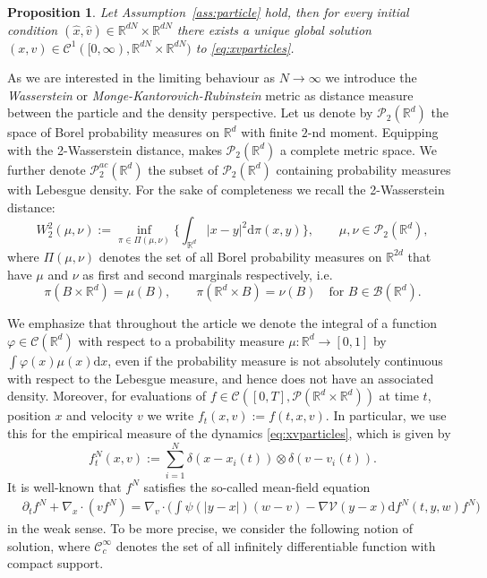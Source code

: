 \documentclass[11pt]{article}
\newtheorem{proposition}[theorem]{Proposition}
\newcommand{\R}[0]{\mathbb R}
\newcommand{\calC}[0]{\mathcal C}
\newcommand{\calP}[0]{\mathcal P}
\newcommand{\dd}[0]{\mathrm d}
\newcommand{\sumi}[0]{\sum_{i=1}^N}
\newcommand{\V}[0]{\mathcal V}
\newcommand{\fN}[0]{f^N}
\begin{document}
\begin{bibunit}[abbrv]
\begin{proposition}\label{prop:WellODE}\cite{teschl}
Let Assumption~\ref{ass:particle} hold, then for every initial condition $(\hat x, \hat v) \in \R^{dN}\times \R^{dN}$ there exists a unique global solution $(x,v) \in \calC^1([0,\infty),\R^{dN}\times\R^{dN})$ to  \eqref{eq:xvparticles}.
\end{proposition}
%
As we are interested in the limiting behaviour as $N\rightarrow \infty$ we introduce the \textit{Wasserstein} or \textit{Monge-Kantorovich-Rubinstein} metric as distance measure between the particle and the density perspective. 
Let us denote by $\calP_2(\R^d)$ the space of Borel probability measures on $\R^d$ with finite $2$-nd moment. Equipping with the 2-Wasserstein distance, makes $\calP_2(\R^d)$ a complete metric space. We further denote $\calP_2^{ac}(\R^d)$ the subset of $\calP_2(\R^d)$ containing probability measures with Lebesgue density. For the sake of completeness we recall the 2-Wasserstein distance:
\[
W_2^2(\mu, \nu) := \inf\limits_{\pi \in \Pi(\mu, \nu)}\biggl\{\int_{\R^d} |x -y|^2 \dd\pi(x,y)\biggr\},\qquad \mu,\nu\in \calP_2(\R^d),
\]
where $\Pi(\mu,\nu)$ denotes the set of all Borel probability measures on $ \R^{2d}$ that have $\mu$ and $\nu$ as first and second marginals respectively, i.e.\
\[
\pi(B \times \R^d) = \mu(B), \qquad \pi(\R^d \times B) = \nu(B) \quad \text{for } B \in \mathcal{B}(\R^{d}).
\]

We emphasize that throughout the article we denote the integral of a function $\varphi \in \calC(\R^d)$ with respect to a probability measure $\mu \colon \R^d \rightarrow [0,1]$ by $\int \varphi(x) \mu(x) \dd x$, even if the probability measure is not absolutely continuous with respect to the Lebesgue measure, and hence does not have an associated density. Moreover, for evaluations of $f \in \calC([0,T],\calP(\R^d \times \R^d))$ at time $t$, position $x$ and velocity $v$ we write $f_t(x,v) := f(t,x,v)$. In particular, we use this for the empirical measure of the dynamics \eqref{eq:xvparticles}, which is given by
$$ \fN_t(x,v) := \sumi \delta(x - x_i(t)) \otimes \delta(v - v_i(t)). $$
%
It is well-known that $f^N$ satisfies the so-called mean-field equation
\begin{align}\label{eq:evolutionfN}
    &\partial_t \fN + \nabla_x \cdot (v\fN) = \nabla_v \cdot \Big( \int \psi(| y -  x |)(w - v) - \nabla \V(y - x) \dd f^N(t,y,w) \fN \Big)
\end{align}
in the weak sense. To be more precise, we consider the following notion of solution, where 
$\mathcal{C}_c^\infty$ denotes the set of all infinitely differentiable function with compact support.


\end{bibunit}
\end{document}
